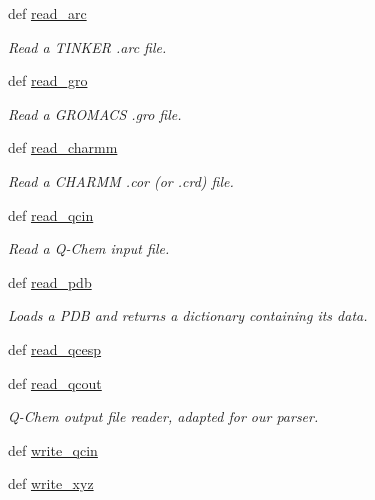 \begin{DoxyCompactItemize}
def \hyperlink{classforcebalance_1_1molecule_1_1Molecule_aeb5983ae61079198f077f55e448e2c32}{read\-\_\-arc}
\begin{DoxyCompactList}\small\item\em Read a T\-I\-N\-K\-E\-R .arc file. \end{DoxyCompactList}\item 
def \hyperlink{classforcebalance_1_1molecule_1_1Molecule_a963a4382dc59ebd8dd9ee2064843e355}{read\-\_\-gro}
\begin{DoxyCompactList}\small\item\em Read a G\-R\-O\-M\-A\-C\-S .gro file. \end{DoxyCompactList}\item 
def \hyperlink{classforcebalance_1_1molecule_1_1Molecule_a8b8d3444945cab760288f28996787855}{read\-\_\-charmm}
\begin{DoxyCompactList}\small\item\em Read a C\-H\-A\-R\-M\-M .cor (or .crd) file. \end{DoxyCompactList}\item 
def \hyperlink{classforcebalance_1_1molecule_1_1Molecule_a003b182b54de4473c4691ae1474b1ada}{read\-\_\-qcin}
\begin{DoxyCompactList}\small\item\em Read a Q-\/\-Chem input file. \end{DoxyCompactList}\item 
def \hyperlink{classforcebalance_1_1molecule_1_1Molecule_afadc87c0cc32dc73558cd901a4c64dd4}{read\-\_\-pdb}
\begin{DoxyCompactList}\small\item\em Loads a P\-D\-B and returns a dictionary containing its data. \end{DoxyCompactList}\item 
def \hyperlink{classforcebalance_1_1molecule_1_1Molecule_a27fb6201b435a3b205ae62f605256f3d}{read\-\_\-qcesp}
\item 
def \hyperlink{classforcebalance_1_1molecule_1_1Molecule_a8c9e71843e7123c57c43c24af2d84f25}{read\-\_\-qcout}
\begin{DoxyCompactList}\small\item\em Q-\/\-Chem output file reader, adapted for our parser. \end{DoxyCompactList}\item 
def \hyperlink{classforcebalance_1_1molecule_1_1Molecule_af46b2ba6ef777cf8301bc16e157c724d}{write\-\_\-qcin}
\item 
def \hyperlink{classforcebalance_1_1molecule_1_1Molecule_adc6620e8287edabe161442de12295f75}{write\-\_\-xyz}

\end{DoxyCompactItemize}
